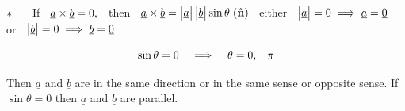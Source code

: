 \documentclass[11pt,a4paper]{article}
\begin{document}
$*\hspace{0.5cm}$ If $\hspace{0.2cm}\underline{a}\times \underline{b} = 0,\hspace{0.2cm}$ then $\hspace{0.2cm}\underline{a}\times \underline{b} = \begin{vmatrix}
\underline{a}\\
\end{vmatrix} \begin{vmatrix}
\underline{b}\\
\end{vmatrix}\sin \theta\hspace{0.1cm}(\hat{\textbf{n}})\hspace{0.2cm}$ either $\hspace{0.2cm} \begin{vmatrix}
\underline{a}\\
\end{vmatrix} = 0 \implies \underline{a}= \underline{0}\hspace{0.2cm}$ or $\hspace{0.2cm} \begin{vmatrix}
\underline{b}\\
\end{vmatrix} = 0\implies \underline{b} = \underline{0}$

$$\sin \theta = 0 \hspace{0.3cm} \implies \hspace{0.3cm} \theta = 0, \hspace{0.3cm} \pi$$

Then $\underline{a}$ and $\underline{b}$ are in the same direction or in the same sense or opposite sense. If $\sin \theta = 0$ then $\underline{a}$ and $\underline{b}$ are parallel.\\\\\\
\end{document}
